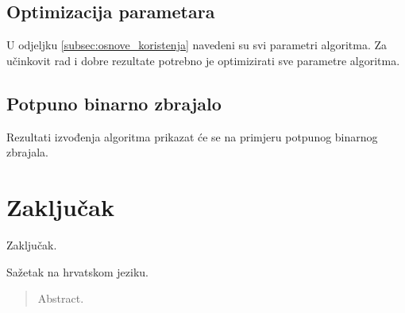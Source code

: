 \documentclass[times, utf8, diplomski]{fer}
\begin{document}
\section{Optimizacija parametara}

U odjeljku \ref{subsec:osnove_koristenja} navedeni su svi parametri algoritma. Za učinkovit rad i dobre rezultate potrebno je optimizirati sve parametre algoritma.


\section{Potpuno binarno zbrajalo}

Rezultati izvođenja algoritma prikazat će se na primjeru potpunog binarnog zbrajala.


\chapter{Zaključak} \label{chapter:conclusion}
Zaključak.




\begin{sazetak}
Sažetak na hrvatskom jeziku.

\end{sazetak}

\begin{abstract}
Abstract.

\end{abstract}
\end{document}
